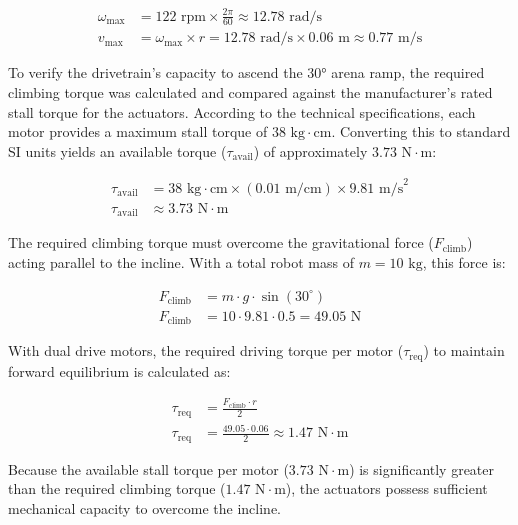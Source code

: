 \documentclass[11pt]{article}
\begin{document}
\begin{align}
    \omega_{\text{max}} &= 122 \text{ rpm} \times \frac{2\pi}{60} \approx 12.78 \text{ rad/s} \\
    v_{\text{max}} &= \omega_{\text{max}} \times r = 12.78 \text{ rad/s} \times 0.06 \text{ m} \approx 0.77 \text{ m/s}
\end{align}

To verify the drivetrain's capacity to ascend the 30° arena ramp, the required climbing torque was calculated and compared against the manufacturer's rated stall torque for the actuators. According to the technical specifications, each motor provides a maximum stall torque of $38\text{ kg}\cdot\text{cm}$. Converting this to standard SI units yields an available torque ($\tau_{\text{avail}}$) of approximately $3.73\text{ N}\cdot\text{m}$:

\begin{align}
    \tau_{\text{avail}} &= 38\text{ kg}\cdot\text{cm} \times \left(0.01\text{ m/cm}\right) \times 9.81\text{ m/s}^2 \nonumber \\
    \tau_{\text{avail}} &\approx 3.73\text{ N}\cdot\text{m}
\end{align}

The required climbing torque must overcome the gravitational force ($F_{\text{climb}}$) acting parallel to the incline. With a total robot mass of $m = 10\text{ kg}$, this force is:

\begin{align}
    F_{\text{climb}} &= m \cdot g \cdot \sin(30^\circ) \nonumber \\
    F_{\text{climb}} &= 10 \cdot 9.81 \cdot 0.5 = 49.05\text{ N}
\end{align}

With dual drive motors, the required driving torque per motor ($\tau_{\text{req}}$) to maintain forward equilibrium is calculated as:

\begin{align}
    \tau_{\text{req}} &= \frac{F_{\text{climb}} \cdot r}{2} \nonumber \\
    \tau_{\text{req}} &= \frac{49.05 \cdot 0.06}{2} \approx 1.47\text{ N}\cdot\text{m}
\end{align}

Because the available stall torque per motor ($3.73\text{ N}\cdot\text{m}$) is significantly greater than the required climbing torque ($1.47\text{ N}\cdot\text{m}$), the actuators possess sufficient mechanical capacity to overcome the incline.
\end{document}
